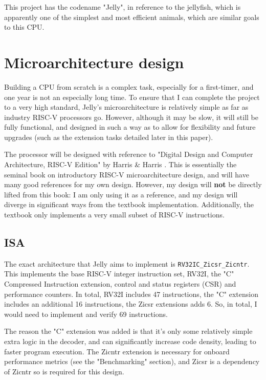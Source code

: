 \documentclass{article}
\begin{document}
This project has the codename "Jelly", in
reference to the jellyfish, which is apparently one of the simplest and most efficient animals, which are
similar goals to this CPU.

\section{Microarchitecture design}
Building a CPU from scratch is a complex task, especially for a first-timer, and one year is not an especially
long time. To ensure that I can complete the project to a very high standard, Jelly's microarchitecture is
relatively simple as far as industry RISC-V processors go. However, although it may be slow, it will still be
fully functional, and designed in such a way as to allow for flexibility and future upgrades (such as the
extension tasks detailed later in this paper).

The processor will be designed with reference to "Digital Design and Computer Architecture, RISC-V Edition" 
by Harris \& Harris \cite{harrisharris}.
This is essentially the seminal book on introductory RISC-V microarchitecture design, and 
will have many good references for my own design. However, my design will \textbf{not} be directly lifted from
this book: I am only using it as a reference, and my design will diverge in significant ways from the textbook
implementation. Additionally, the textbook only implements a very small subset of RISC-V instructions.

\subsection{ISA}
The exact architecture that Jelly aims to implement is \verb|RV32IC_Zicsr_Zicntr|. 
This implements the base RISC-V integer
instruction set, RV32I, the "C" Compressed Instruction extension, control and status registers (CSR)
and performance counters. In total, RV32I includes 47
instructions, the "C" extension includes an additional 16 instructions, the Zicsr extensions adds 6. 
So, in total, I would need to implement and verify 69 instructions.

The reason the "C" extension was added is that it's only some relatively simple extra logic in the decoder,
and can significantly increase code density, leading to faster program execution. The Zicntr extension is
necessary for onboard performance metrics (see the "Benchmarking" section), and Zicsr is a dependency of Zicntr
so is required for this design.
\end{document}

